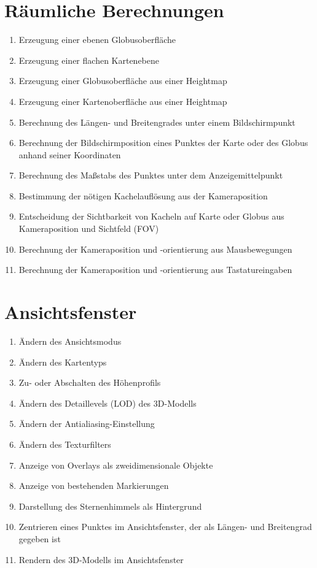 \documentclass[10pt]{scrreprt}
\newcommand{\ziel}[1]{{\fontsize{9.5}{11}\textsf{/#1/}}}
\newcommand{\ziellabel}{Z}
\newcommand{\muss}{\renewcommand{\labelenumi}{\textbf{\ziel{\ziellabel\numprint{\theenumi}0}}}}
\newcommand{\wunsch}{\renewcommand{\labelenumi}{\textbf{\ziel{\ziellabel\numprint{\theenumi}0W}}}}
\begin{document}
\section{Räumliche Berechnungen}
\begin{enumerate}[leftmargin=2.2cm,resume]
\item Erzeugung einer ebenen Globusoberfläche
\item Erzeugung einer flachen Kartenebene
\wunsch
\item Erzeugung einer Globusoberfläche aus einer Heightmap
\item Erzeugung einer Kartenoberfläche aus einer Heightmap
\muss
\item Berechnung des Längen- und Breitengrades unter einem Bildschirmpunkt
\item Berechnung der Bildschirmposition eines Punktes der Karte oder des Globus anhand seiner Koordinaten
\wunsch
\item Berechnung des Maßstabs des Punktes unter dem Anzeigemittelpunkt
\muss
\item Bestimmung der nötigen Kachelauflösung aus der Kameraposition
\item Entscheidung der Sichtbarkeit von Kacheln auf Karte oder Globus aus Kameraposition und Sichtfeld (FOV)
\item Berechnung der Kameraposition und -orientierung aus Mausbewegungen
\item Berechnung der Kameraposition und -orientierung aus Tastatureingaben
\end{enumerate}

\section{Ansichtsfenster}
\begin{enumerate}[leftmargin=2.2cm,resume]
\item Ändern des Ansichtsmodus
\item Ändern des Kartentyps
\wunsch
\item Zu- oder Abschalten des Höhenprofils
\item Ändern des Detaillevels (LOD) des 3D-Modells
\item Ändern der Antialiasing-Einstellung
\item Ändern des Texturfilters
\muss
\item Anzeige von Overlays als zweidimensionale Objekte
\wunsch
\item Anzeige von bestehenden Markierungen
\muss
\item Darstellung des Sternenhimmels als Hintergrund
\item Zentrieren eines Punktes im Ansichtsfenster, der als Längen- und Breitengrad gegeben ist
\item Rendern des 3D-Modells im Ansichtsfenster
\end{enumerate}
\end{document}
